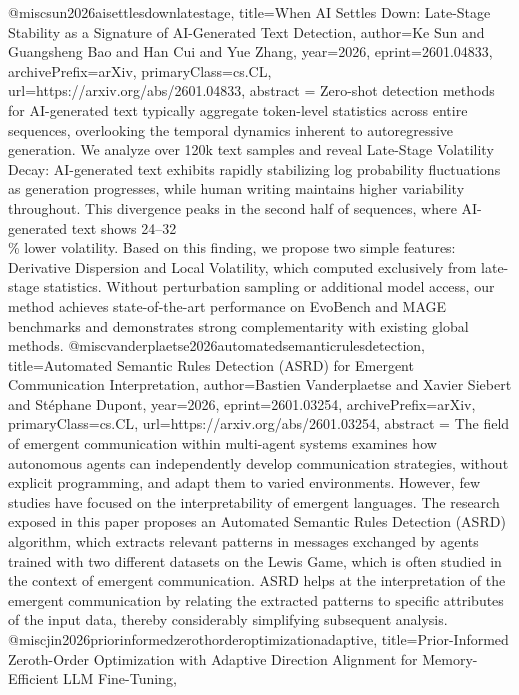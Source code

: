 {}@misc{sun2026aisettlesdownlatestage,
      title={When AI Settles Down: Late-Stage Stability as a Signature of AI-Generated Text Detection}, 
      author={Ke Sun and Guangsheng Bao and Han Cui and Yue Zhang},
      year={2026},
      eprint={2601.04833},
      archivePrefix={arXiv},
      primaryClass={cs.CL},
      url={https://arxiv.org/abs/2601.04833},
      abstract = {Zero-shot detection methods for AI-generated text typically aggregate token-level statistics across entire sequences, overlooking the temporal dynamics inherent to autoregressive generation. We analyze over 120k text samples and reveal Late-Stage Volatility Decay: AI-generated text exhibits rapidly stabilizing log probability fluctuations as generation progresses, while human writing maintains higher variability throughout. This divergence peaks in the second half of sequences, where AI-generated text shows 24--32\\\% lower volatility. Based on this finding, we propose two simple features: Derivative Dispersion and Local Volatility, which computed exclusively from late-stage statistics. Without perturbation sampling or additional model access, our method achieves state-of-the-art performance on EvoBench and MAGE benchmarks and demonstrates strong complementarity with existing global methods.}
}@misc{vanderplaetse2026automatedsemanticrulesdetection,
      title={Automated Semantic Rules Detection (ASRD) for Emergent Communication Interpretation}, 
      author={Bastien Vanderplaetse and Xavier Siebert and Stéphane Dupont},
      year={2026},
      eprint={2601.03254},
      archivePrefix={arXiv},
      primaryClass={cs.CL},
      url={https://arxiv.org/abs/2601.03254},
      abstract = {The field of emergent communication within multi-agent systems examines how autonomous agents can independently develop communication strategies, without explicit programming, and adapt them to varied environments. However, few studies have focused on the interpretability of emergent languages. The research exposed in this paper proposes an Automated Semantic Rules Detection (ASRD) algorithm, which extracts relevant patterns in messages exchanged by agents trained with two different datasets on the Lewis Game, which is often studied in the context of emergent communication. ASRD helps at the interpretation of the emergent communication by relating the extracted patterns to specific attributes of the input data, thereby considerably simplifying subsequent analysis.}
}@misc{jin2026priorinformedzerothorderoptimizationadaptive,
      title={Prior-Informed Zeroth-Order Optimization with Adaptive Direction Alignment for Memory-Efficient LLM Fine-Tuning}, 
}
